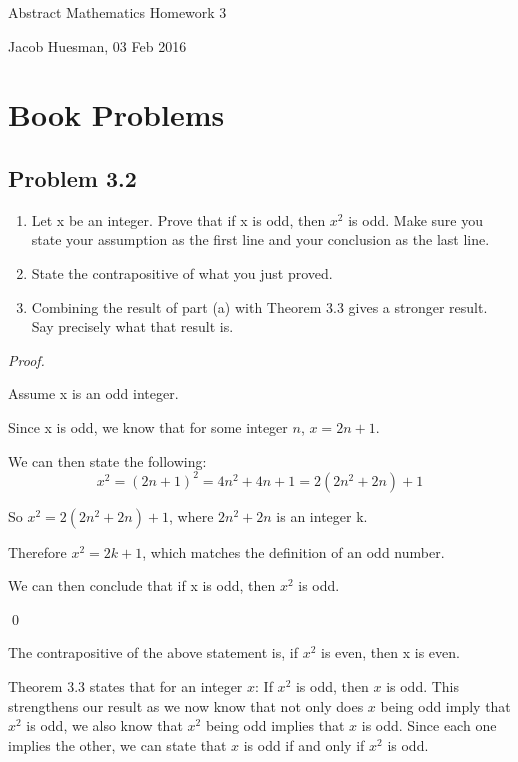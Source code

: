\documentclass{article}
\begin{document}
\centerline{\sc \large Abstract Mathematics Homework 3}
\vspace{.5pc}
\centerline{\sc Jacob Huesman, 03 Feb 2016}

\vspace{2pc}


\section{Book Problems}
\subsection{Problem 3.2}
\renewcommand{\labelenumi}{(\alph{enumi})}
\begin{enumerate}
	\item Let x be an integer. Prove that if x is odd, then $x^2$ is odd. Make sure you state your assumption as the first line and your conclusion as the last line.	
	\item State the contrapositive of what you just proved.
	\item Combining the result of part (a) with Theorem 3.3 gives a stronger result. Say precisely what that result is.
\end{enumerate}
	
\textit{Proof.}
\begin{addmargin}[0.75cm]{0cm}
	Assume x is an odd integer.
	
	Since x is odd, we know that for some integer $n$, $x=2n+1$.
	
	We can then state the following:
	\begin{equation}
		x^2 = (2n+1)^2 = 4n^2+4n+1 
		= 2(2n^2+2n)+1
	\end{equation}
	
	So $x^2 = 2(2n^2 + 2n) + 1$, where $2n^2 + 2n$ is an integer k.
	
	Therefore $x^2=2k+1$, which matches the definition of an odd number.
	
	We can then conclude that if x is odd, then $x^2$ is odd.

	\qed
\end{addmargin}

The contrapositive of the above statement is, if $x^2$ is even, then x is even.

Theorem 3.3 states that for an integer $x$: If $x^2$ is odd, then $x$ is odd.
This strengthens our result as we now know that not only does $x$ being odd imply that
$x^2$ is odd, we also know that $x^2$ being odd implies that $x$ is odd. Since each one
implies the other, we can state that $x$ is odd if and only if $x^2$ is odd.
\end{document}
